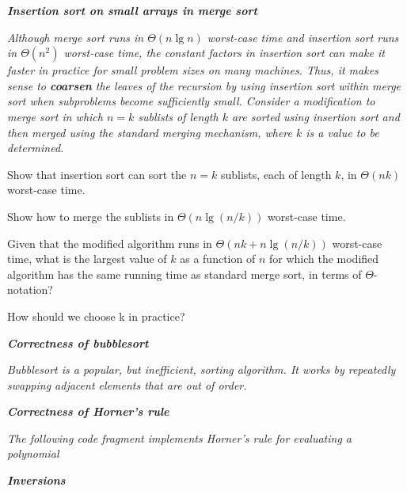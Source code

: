 \begin{description}
   {\bfseries \itshape Insertion sort on small arrays in merge sort}

    {\itshape Although merge sort runs in $\Theta(n \lg n)$ worst-case time and insertion sort runs in $\Theta(n^2)$ worst-case time, the constant factors in insertion sort can make it faster in practice for small problem sizes on many machines. Thus, it makes sense to {\bfseries coarsen} the leaves of the recursion by using insertion sort within merge sort when subproblems become sufficiently small. Consider a modification to merge sort in which $n=k$ sublists of length $k$ are sorted using insertion sort and then merged using the standard merging mechanism, where $k$ is a value to be determined.
      \begin{Al}
        \item Show that insertion sort can sort the $n=k$ sublists, each of length $k$, in $\Theta (nk)$  worst-case time.
        \item Show how to merge the sublists in $\Theta (n\lg (n/k))$ worst-case time.
        \item Given that the modified algorithm runs in $\Theta(nk + n\lg (n/k))$ worst-case time, what is the largest value of $k$ as a function of $n$ for which the modified algorithm has the same running time as standard merge sort, in terms of $\Theta$-notation?
        \item How should we choose k in practice?
      \end{Al}
    }

    \begin{pbrev}
      
    \end{pbrev}

   {\bfseries \itshape Correctness of bubblesort}

    {\itshape Bubblesort is a popular, but inefficient, sorting algorithm. It works by repeatedly
    swapping adjacent elements that are out of order.}

    \begin{pbrev}
      
    \end{pbrev}

   {\bfseries \itshape Correctness of Horner’s rule}

    {\itshape The following code fragment implements Horner’s rule for evaluating a polynomial}

    \begin{pbrev}
      
    \end{pbrev}

   {\bfseries \itshape Inversions}

    \begin{pbrev}
      
    \end{pbrev}

\end{description}

